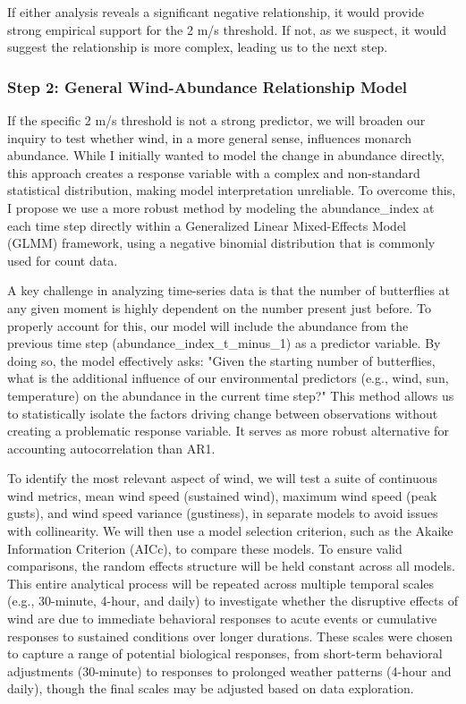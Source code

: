 If either analysis reveals a significant negative relationship, it would provide strong empirical support for the 2 m/s threshold. If not, as we suspect, it would suggest the relationship is more complex, leading us to the next step.

\subsubsection{Step 2: General Wind-Abundance Relationship Model}

If the specific 2 m/s threshold is not a strong predictor, we will broaden our inquiry to test whether wind, in a more general sense, influences monarch abundance. While I initially wanted to model the change in abundance directly, this approach creates a response variable with a complex and non-standard statistical distribution, making model interpretation unreliable. To overcome this, I propose we use a more robust method by modeling the abundance_index at each time step directly within a Generalized Linear Mixed-Effects Model (GLMM) framework, using a negative binomial distribution that is commonly used for count data.

A key challenge in analyzing time-series data is that the number of butterflies at any given moment is highly dependent on the number present just before. To properly account for this, our model will include the abundance from the previous time step (abundance_index_t_minus_1) as a predictor variable. By doing so, the model effectively asks: "Given the starting number of butterflies, what is the additional influence of our environmental predictors (e.g., wind, sun, temperature) on the abundance in the current time step?" This method allows us to statistically isolate the factors driving change between observations without creating a problematic response variable. It serves as more robust alternative for accounting autocorrelation than AR1.

To identify the most relevant aspect of wind, we will test a suite of continuous wind metrics, mean wind speed (sustained wind), maximum wind speed (peak gusts), and wind speed variance (gustiness), in separate models to avoid issues with collinearity. We will then use a model selection criterion, such as the Akaike Information Criterion (AICc), to compare these models. To ensure valid comparisons, the random effects structure will be held constant across all models. This entire analytical process will be repeated across multiple temporal scales (e.g., 30-minute, 4-hour, and daily) to investigate whether the disruptive effects of wind are due to immediate behavioral responses to acute events or cumulative responses to sustained conditions over longer durations. These scales were chosen to capture a range of potential biological responses, from short-term behavioral adjustments (30-minute) to responses to prolonged weather patterns (4-hour and daily), though the final scales may be adjusted based on data exploration.

